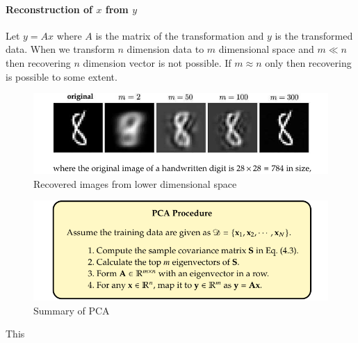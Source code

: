 \documentclass[12pt,reqno]{amsart}
\theoremstyle{plain}
\theoremstyle{definition}
\begin{document}
\paragraph{\bf Reconstruction of $x$ from $y$} Let $y = Ax$ where $A$ is the matrix of the transformation and $y$ is the transformed data. When we transform $n$ dimension data to $m$ dimensional space and $m \ll n$ then recovering $n$ dimension vector is not possible. If $m \approx n$ only then recovering is possible to some extent.
\begin{figure}[!ht]
    \centerline{\includegraphics[scale=.5]{assests/recover.png}}
    \caption{Recovered images from lower dimensional space}
    \label{fig4}
\end{figure}
\begin{figure}[!ht]
    \centerline{\includegraphics[scale=.6]{assests/summary_pca.png}}
    \caption{Summary of PCA}
    \label{fig3}
\end{figure}
This 
\end{document}
